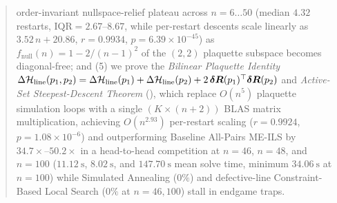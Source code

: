 \begin{abstract}
order-invariant nullspace-relief plateau across $n = 6\dots 50$ (median $4.32$ restarts, $\text{IQR} = 2.67\text{--}8.67$, while per-restart descents scale linearly as $3.52\,n + 20.86$, $r = 0.9934$, $p = 6.39\times 10^{-45}$) as $f_{\mathrm{null}}(n) = 1 - 2/(n-1)^2$ of the $(2,2)$ plaquette subspace becomes diagonal-free; and (5) we prove the \emph{Bilinear Plaquette Identity} $\Delta\Hline(p_1, p_2) = \Delta\Hline(p_1) + \Delta\Hline(p_2) + 2\,\boldsymbol{\delta R}(p_1)^\top \boldsymbol{\delta R}(p_2)$ and \emph{Active-Set Steepest-Descent Theorem} (), which replace $O(n^5)$ plaquette simulation loops with a single $(K \times (n+2))$ BLAS matrix multiplication, achieving $O(n^{2.93})$ per-restart scaling ($r = 0.9924$, $p = 1.08\times 10^{-6}$) and outperforming Baseline All-Pairs ME-ILS by $34.7\times\text{--}50.2\times$ in a head-to-head competition at $n = 46$, $n = 48$, and $n = 100$ ($11.12~\text{s}$, $8.02~\text{s}$, and $147.70~\text{s}$ mean solve time, minimum $34.06~\text{s}$ at $n=100$) while Simulated Annealing ($0\%$) and defective-line Constraint-Based Local Search ($0\%$ at $n=46, 100$) stall in endgame traps.
\end{abstract}
